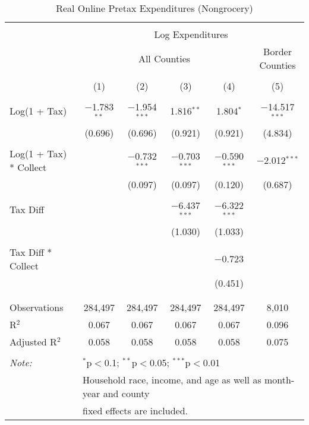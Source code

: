 
\begin{table}[!htbp] \centering 
  \caption{Real Online Pretax Expenditures (Nongrocery)} 
  \label{} 
\begin{tabular}{@{\extracolsep{5pt}}lccccc} 
\\[-1.8ex]\hline 
\hline \\[-1.8ex] 
 & \multicolumn{5}{c}{Log Expenditures} \\ 
\cline{2-6} 
 & \multicolumn{4}{c}{All Counties} & Border Counties \\ 
\\[-1.8ex] & (1) & (2) & (3) & (4) & (5)\\ 
\hline \\[-1.8ex] 
 Log(1 + Tax) & $-$1.783$^{**}$ & $-$1.954$^{***}$ & 1.816$^{**}$ & 1.804$^{*}$ & $-$14.517$^{***}$ \\ 
  & (0.696) & (0.696) & (0.921) & (0.921) & (4.834) \\ 
  & & & & & \\ 
 Log(1 + Tax) * Collect &  & $-$0.732$^{***}$ & $-$0.703$^{***}$ & $-$0.590$^{***}$ & $-$2.012$^{***}$ \\ 
  &  & (0.097) & (0.097) & (0.120) & (0.687) \\ 
  & & & & & \\ 
 Tax Diff &  &  & $-$6.437$^{***}$ & $-$6.322$^{***}$ &  \\ 
  &  &  & (1.030) & (1.033) &  \\ 
  & & & & & \\ 
 Tax Diff * Collect &  &  &  & $-$0.723 &  \\ 
  &  &  &  & (0.451) &  \\ 
  & & & & & \\ 
\hline \\[-1.8ex] 
Observations & 284,497 & 284,497 & 284,497 & 284,497 & 8,010 \\ 
R$^{2}$ & 0.067 & 0.067 & 0.067 & 0.067 & 0.096 \\ 
Adjusted R$^{2}$ & 0.058 & 0.058 & 0.058 & 0.058 & 0.075 \\ 
\hline 
\hline \\[-1.8ex] 
\textit{Note:}  & \multicolumn{5}{l}{$^{*}$p$<$0.1; $^{**}$p$<$0.05; $^{***}$p$<$0.01} \\ 
 & \multicolumn{5}{l}{Household race, income, and age as well as month-year and county} \\ 
 & \multicolumn{5}{l}{fixed effects are included.} \\ 
\end{tabular} 
\end{table} 
